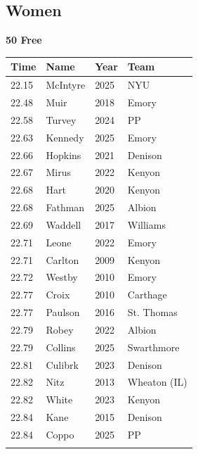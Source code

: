 


\subsection{Women}
\vspace{-.2em}
\noindent\begin{minipage}[t]{0.98\textwidth}
\centering
\textbf{\textcolor{teamprimary}{50 Free}}\par
\vspace{0.5em}
\centering
\small
\renewcommand{\arraystretch}{1.0}
\setlength{\tabcolsep}{4pt}
\begin{tabular}{@{}p{2.5cm}p{4.5cm}p{1.5cm}p{2.5cm}@{}}
\toprule
\textbf{Time} & \textbf{Name} & \textbf{Year} & \textbf{Team} \\
\midrule
22.15 & McIntyre & 2025 & NYU \\
22.48 & Muir & 2018 & Emory \\
22.58 & Turvey & 2024 & PP \\
22.63 & Kennedy & 2025 & Emory \\
22.66 & Hopkins & 2021 & Denison \\
22.67 & Mirus & 2022 & Kenyon \\
22.68 & Hart & 2020 & Kenyon \\
22.68 & Fathman & 2025 & Albion \\
22.69 & Waddell & 2017 & Williams \\
22.71 & Leone & 2022 & Emory \\
22.71 & Carlton & 2009 & Kenyon \\
22.72 & Westby & 2010 & Emory \\
22.77 & Croix & 2010 & Carthage \\
22.77 & Paulson & 2016 & St. Thomas \\
22.79 & Robey & 2022 & Albion \\
22.79 & Collins & 2025 & Swarthmore \\
22.81 & Culibrk & 2023 & Denison \\
22.82 & Nitz & 2013 & Wheaton (IL) \\
22.82 & White & 2023 & Kenyon \\
22.84 & Kane & 2015 & Denison \\
22.84 & Coppo & 2025 & PP \\
\bottomrule
\vspace{0.5em}
\end{tabular}
\end{minipage}
